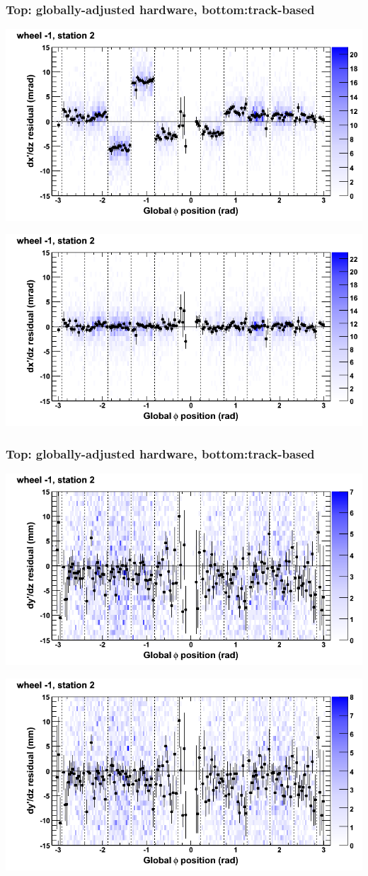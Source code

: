\documentclass[compress]{beamer}
\begin{document}
\begin{frame}
\frametitle{Top: globally-adjusted hardware, bottom:track-based}
\includegraphics[width=0.7\linewidth]{NOV4_mapplots_HW/DTvsphi_st2whB_dxdz.png}

\includegraphics[width=0.7\linewidth]{NOV4_mapplots/DTvsphi_st2whB_dxdz.png}
\end{frame}

\begin{frame}
\frametitle{Top: globally-adjusted hardware, bottom:track-based}
\includegraphics[width=0.7\linewidth]{NOV4_mapplots_HW/DTvsphi_st2whB_dydz.png}

\includegraphics[width=0.7\linewidth]{NOV4_mapplots/DTvsphi_st2whB_dydz.png}
\end{frame}
\end{document}
